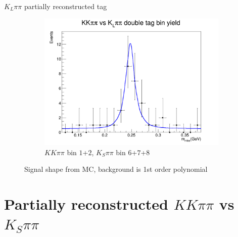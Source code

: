 \documentclass{beamer}
\begin{document}
\begin{frame}{$K_L\pi\pi$ partially reconstructed tag}
\begin{figure}
\begin{subfigure}{0.49\textwidth}
      \includegraphics[width=\textwidth]{Plots/KLpipi_1_DoubleTagYield.png}
      \caption{$KK\pi\pi$ bin $1$+$2$, $K_S\pi\pi$ bin $6$+$7$+$8$}
    \end{subfigure}
    \caption{Signal shape from MC, background is 1st order polynomial}
  \end{figure}
\end{frame}

\section{Partially reconstructed \texorpdfstring{$KK\pi\pi$}{KKpipi} vs \texorpdfstring{$K_S\pi\pi$}{KSpipi}}
\end{document}
